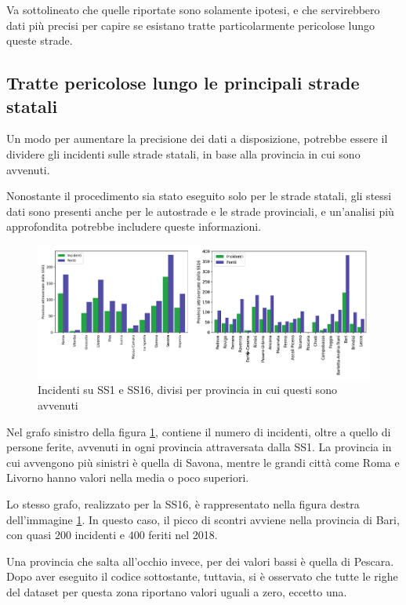 \documentclass[a4paper,12pt]{report}
\begin{document}
Va sottolineato che quelle riportate sono solamente ipotesi, e che servirebbero 
dati più precisi per capire se esistano tratte particolarmente 
pericolose lungo queste strade.

\subsection{Tratte pericolose lungo le principali strade statali}

Un modo per aumentare la precisione dei dati a disposizione, potrebbe essere il 
dividere gli incidenti sulle strade statali, in base alla provincia in cui sono avvenuti.

Nonostante il procedimento sia stato eseguito solo per le strade statali, gli stessi dati 
sono presenti anche per le autostrade e le strade provinciali, e un'analisi più 
approfondita potrebbe includere queste informazioni.
\begin{figure}
    \includegraphics[width=\linewidth]{img_unite/tratti_ss1_ss16.png}
    \caption{Incidenti su SS1 e SS16, divisi per provincia in cui questi sono avvenuti}
    \label{fig:incidenti-strade-statali}
\end{figure}

Nel grafo sinistro della figura \ref{fig:incidenti-strade-statali}, contiene il numero di 
incidenti, oltre a quello di persone ferite, avvenuti in ogni provincia attraversata dalla SS1. 
La provincia in cui avvengono più sinistri è quella di Savona, mentre le grandi città come 
Roma e Livorno hanno valori nella media o poco superiori.

Lo stesso grafo, realizzato per la SS16, è rappresentato nella figura destra dell'immagine 
\ref{fig:incidenti-strade-statali}. 
In questo caso, il picco di scontri avviene nella provincia 
di Bari, con quasi $200$ incidenti e $400$ feriti nel 2018. 

Una provincia che salta all'occhio invece, per dei valori bassi è quella di Pescara. 
Dopo aver eseguito il codice sottostante, tuttavia, si è osservato che tutte le righe 
del dataset per questa zona riportano valori uguali a zero, eccetto una. 
\end{document}
